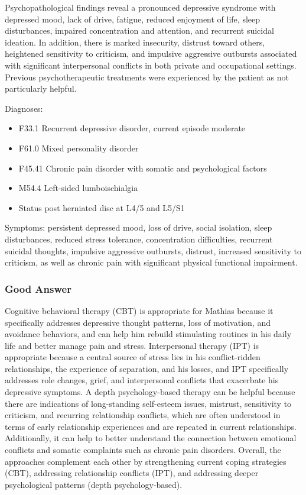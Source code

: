 \documentclass[sigconf,natbib=false]{acmart}
\begin{document}
Psychopathological findings reveal a pronounced depressive syndrome with depressed mood, lack of drive, fatigue, reduced enjoyment of life, sleep disturbances, impaired concentration and attention, and recurrent suicidal ideation.
In addition, there is marked insecurity, distrust toward others, heightened sensitivity to criticism, and impulsive aggressive outbursts associated with significant interpersonal conflicts in both private and occupational settings.
Previous psychotherapeutic treatments were experienced by the patient as not particularly helpful.

Diagnoses:
\begin{itemize}
\item F33.1 Recurrent depressive disorder, current episode moderate
\item F61.0 Mixed personality disorder
\item F45.41 Chronic pain disorder with somatic and psychological factors
\item M54.4 Left-sided lumboischialgia
\item Status post herniated disc at L4/5 and L5/S1
\end{itemize}
Symptoms: persistent depressed mood, loss of drive, social isolation, sleep disturbances, reduced stress tolerance, concentration difficulties, recurrent suicidal thoughts, impulsive aggressive outbursts, distrust, increased sensitivity to criticism, as well as chronic pain with significant physical functional impairment.
\subsubsection{Good Answer}
Cognitive behavioral therapy (CBT) is appropriate for Mathias because it specifically addresses depressive thought patterns, loss of motivation, and avoidance behaviors, and can help him rebuild stimulating routines in his daily life and better manage pain and stress.
Interpersonal therapy (IPT) is appropriate because a central source of stress lies in his conflict-ridden relationships, the experience of separation, and his losses, and IPT specifically addresses role changes, grief, and interpersonal conflicts that exacerbate his depressive symptoms.
A depth psychology-based therapy can be helpful because there are indications of long-standing self-esteem issues, mistrust, sensitivity to criticism, and recurring relationship conflicts, which are often understood in terms of early relationship experiences and are repeated in current relationships.
Additionally, it can help to better understand the connection between emotional conflicts and somatic complaints such as chronic pain disorders.
Overall, the approaches complement each other by strengthening current coping strategies (CBT), addressing relationship conflicts (IPT), and addressing deeper psychological patterns (depth psychology-based).
\end{document}
